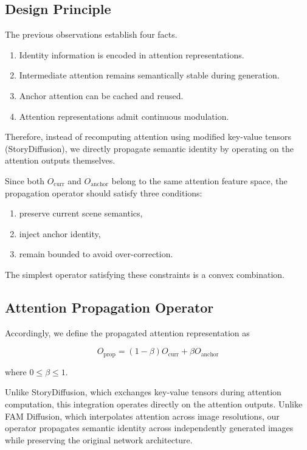 \documentclass[12pt]{article}
\begin{document}
\subsection{Design Principle}

The previous observations establish four facts.

\begin{enumerate}
\item Identity information is encoded in attention representations.
\item Intermediate attention remains semantically stable during generation.
\item Anchor attention can be cached and reused.
\item Attention representations admit continuous modulation.
\end{enumerate}

Therefore, instead of recomputing attention using modified key-value tensors (StoryDiffusion), we directly propagate semantic identity by operating on the attention outputs themselves.

Since both $O_{\mathrm{curr}}$ and $O_{\mathrm{anchor}}$ belong to the same attention feature space, the propagation operator should satisfy three conditions:

\begin{enumerate}
\item preserve current scene semantics,
\item inject anchor identity,
\item remain bounded to avoid over-correction.
\end{enumerate}

The simplest operator satisfying these constraints is a convex combination.

\subsection{Attention Propagation Operator}

Accordingly, we define the propagated attention representation as

\begin{equation}
\boxed{O_{\mathrm{prop}} = (1 - \beta) O_{\mathrm{curr}} + \beta O_{\mathrm{anchor}}}
\tag{20}
\end{equation}

where $0 \le \beta \le 1$.

Unlike StoryDiffusion, which exchanges key-value tensors during attention computation, this integration operates directly on the attention outputs. Unlike FAM Diffusion, which interpolates attention across image resolutions, our operator propagates semantic identity across independently generated images while preserving the original network architecture.
\end{document}
